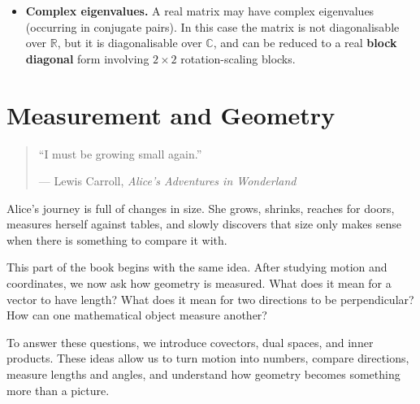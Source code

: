 \documentclass[11pt,openany]{book}
\theoremstyle{definition}
\begin{document}
\begin{itemize}
meaning there is only \textbf{one independent eigendirection}, even though the matrix acts on a two-dimensional space.

\medskip

Because we cannot find two linearly independent eigenvectors, the matrix cannot be diagonalised.
  \item \textbf{Complex eigenvalues.} A real matrix may have complex eigenvalues 
  (occurring in conjugate pairs). In this case the matrix is not diagonalisable 
  over $\mathbb{R}$, but it is diagonalisable over $\mathbb{C}$, and can be 
  reduced to a real \textbf{block diagonal} form involving $2\times 2$ rotation-scaling 
  blocks.
\end{itemize}

\medskip

\part{Measurement and Geometry}
\vspace*{0.35\textheight}

\begin{quote}
\centering
``I must be growing small again.''

\medskip

--- Lewis Carroll, \textit{Alice's Adventures in Wonderland}
\end{quote}



Alice's journey is full of changes in size. She grows, shrinks, reaches for doors, 
measures herself against tables, and slowly discovers that size only makes sense when 
there is something to compare it with.

\medskip

This part of the book begins with the same idea. After studying motion and coordinates, 
we now ask how geometry is measured. What does it mean for a vector to have length? 
What does it mean for two directions to be perpendicular? How can one mathematical object 
measure another?

\medskip

To answer these questions, we introduce covectors, dual spaces, and inner products. These 
ideas allow us to turn motion into numbers, compare directions, measure lengths and 
angles, and understand how geometry becomes something more than a picture.
\end{document}
